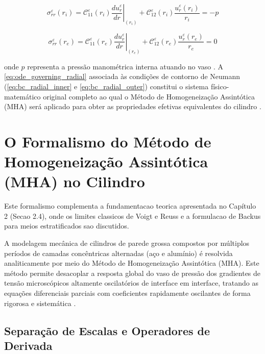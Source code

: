 \begin{equation}
  \sigma_{rr}^\varepsilon (r_i) = \mathcal{C}_{11}^\varepsilon (r_i) \left. \frac{d u_r^\varepsilon}{d r} \right|_{(r_i)} + \mathcal{C}_{12}^\varepsilon (r_i) \frac{u_r^\varepsilon (r_i)}{r_i} = -p
  \label{eq:bc_radial_inner}
\end{equation}

\begin{equation}
  \sigma_{rr}^\varepsilon (r_e) = \mathcal{C}_{11}^\varepsilon (r_e) \left. \frac{d u_r^\varepsilon}{d r} \right|_{(r_e)} + \mathcal{C}_{12}^\varepsilon (r_e) \frac{u_r^\varepsilon (r_e)}{r_e} = 0
  \label{eq:bc_radial_outer}
\end{equation}

onde $p$ representa a pressão manométrica interna atuando no vaso \cite{Sadd2009}. A \eqref{eq:ode_governing_radial} associada às condições de contorno de Neumann (\eqref{eq:bc_radial_inner} e \eqref{eq:bc_radial_outer}) constitui o sistema físico-matemático original completo ao qual o Método de Homogeneização Assintótica (MHA) será aplicado para obter as propriedades efetivas equivalentes do cilindro \cite{Timoshenko_1951}.


\section{O Formalismo do Método de Homogeneização Assintótica (MHA) no Cilindro}\label{subsec:formalismo_mha}

Este formalismo complementa a fundamentacao teorica apresentada no Capítulo 2 (Secao 2.4), onde os limites classicos de Voigt e Reuss e a formulacao de Backus para meios estratificados sao discutidos.

A modelagem mecânica de cilindros de parede grossa compostos por múltiplos períodos de camadas concêntricas alternadas (aço e alumínio) é resolvida analiticamente por meio do Método de Homogeneização Assintótica (MHA). Este método permite desacoplar a resposta global do vaso de pressão dos gradientes de tensão microscópicos altamente oscilatórios de interface em interface, tratando as equações diferenciais parciais com coeficientes rapidamente oscilantes de forma rigorosa e sistemática \cite{bakhvalov1989}.

\subsection{Separação de Escalas e Operadores de Derivada}

